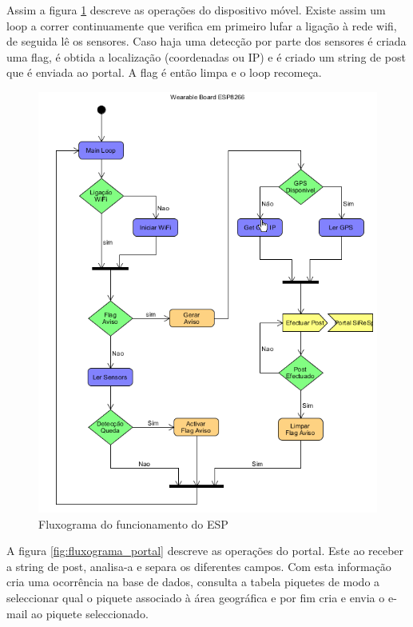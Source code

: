Assim a figura \ref{fig:fluxograma_ESP} descreve as operações do dispositivo móvel. Existe assim um loop a correr continuamente que verifica em primeiro lufar a ligação à rede wifi, de seguida lê os sensores. Caso haja uma detecção por parte dos sensores é criada uma flag, é obtida a localização (coordenadas ou IP) e é criado um string de post que é enviada ao portal. A flag é então limpa e o loop recomeça.

\begin{figure}[!htb]
	\centering
	\includegraphics[width=\textwidth]{figuras/fluxograma_ESP.png}
	\caption{Fluxograma do funcionamento do ESP}
	\label{fig:fluxograma_ESP}
\end{figure}

A figura \ref{fig:fluxograma_portal} descreve as operações do portal. Este ao receber a string de post, analisa-a e separa os diferentes campos. Com esta informação cria uma ocorrência na base de dados, consulta a tabela piquetes de modo a seleccionar qual o piquete associado à área geográfica e por fim cria e envia o e-mail ao piquete seleccionado. 

